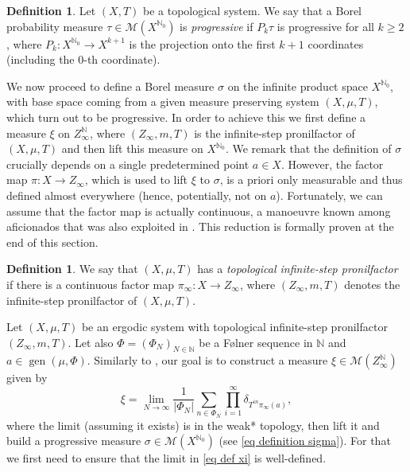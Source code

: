 \documentclass[letter, 11pt]{article}
\theoremstyle{definition}
\newtheorem{defn}[theo]{Definition}
\theoremstyle{plain}
\newcommand{\N}{\mathbb{N}}
\newcommand{\cM}{\mathcal{M}}
\DeclareMathOperator\gen{gen}
\newcommand{\1}{\mathbbm{1}}
\begin{document}
\begin{defn} \label{definition progressive measures in XN}
    Let $(X,T)$ be a topological system.  We say that a Borel probability measure $\tau \in \cM(X^{\N_0})$ is \emph{progressive} if $P_k \tau$ is progressive for all $k \geq 2$, where $P_k \colon X^{\N_0} \to X^{k+1}$ is the projection onto the first $k+1$ coordinates (including the $0$-th coordinate). 
\end{defn}

We now proceed to define a Borel measure $\sigma$ on the infinite product
space $X^{\N_0}$, with base space coming from a given measure preserving 
system $(X,\mu,T)$, which   turn out to be progressive. In order to 
achieve this we   first define a measure $\xi$ on $Z_{\infty}^{\N}$, where $(Z_{\infty},m,T)$ 
is the infinite-step pronilfactor of $(X,\mu,T)$ and then lift this measure 
on $X^{\N_0}$. We remark that the definition of $\sigma$ crucially depends 
on a single predetermined point $a\in X$. However, the factor map $\pi: X\to Z_{\infty}$, which is used to lift $\xi$ to $\sigma$, is a priori only measurable and thus defined almost everywhere (hence, potentially, not on $a$). Fortunately, we can assume that the factor map is actually continuous, a manoeuvre known among aficionados that was also exploited in \cite{kmrr25}. This reduction is formally proven at the end of this section.

\begin{defn} \label{def top infinite step pronil}
We say that $(X,\mu,T)$ has a \emph{topological infinite-step pronilfactor} if there is a continuous factor map $\pi_{\infty}: X \to Z_{\infty}$, where $(Z_{\infty},m,T)$ denotes the infinite-step pronilfactor of $(X,\mu,T)$.  
\end{defn}

Let $(X, \mu,T)$ be an ergodic system with topological infinite-step 
pronilfactor $(Z_{\infty},m,T)$. Let also $\Phi=(\Phi_N)_{N\in \N}$ be 
a F\o lner sequence in $\N$ and $a \in \gen(\mu,\Phi)$. Similarly to \cite{kmrr25}, our goal is to construct a measure $\xi \in \cM(Z_{\infty}^{\N})$ given by
\begin{equation} \label{eq def xi}
   \xi =  \lim_{N \to \infty} \frac{1}{|\Phi_N|} \sum_{n \in \Phi_N} \prod_{i=1}^{\infty}\delta_{T^{in}\pi_{\infty}(a)},
\end{equation}
where the limit (assuming it exists) is in the weak* topology, then lift it and build a progressive measure $\sigma \in \cM(X^{\N_0})$ (see \eqref{eq definition sigma}). For that we first need to ensure that the limit in \eqref{eq def xi} is well-defined. 
\end{document}
